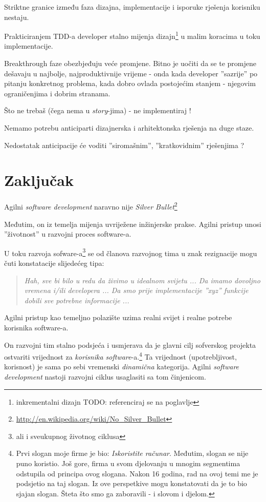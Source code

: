 \documentclass[lmodern, utf8, zavrsni]{fit}
\begin{document}
Striktne granice između faza dizajna, implementacije i isporuke rješenja korisniku nestaju.

Prakticiranjem TDD-a developer stalno mijenja dizajn\footnote{inkrementalni dizajn TODO: referenciraj se na poglavlje} u malim koracima u toku implementacije.

Breakthrough faze obezbjeđuju veće promjene. Bitno je uočiti da se te promjene dešavaju u najbolje, najproduktivnije vrijeme - onda kada developer ''sazrije'' po pitanju konkretnog problema, kada dobro ovlada postojećim stanjem - njegovim ograničenjima i dobrim stranama.

Što ne trebaš (čega nema u \emph{story}-jima) - ne implementiraj !

Nemamo potrebu anticiparti dizajnerska i arhitektonska rješenja na duge staze.

Nedostatak anticipacije će voditi ''siromašnim'', ''kratkovidnim'' rješenjima ?

{\color{red}{::ODGOVORITI, ELABORIRRATI::}}



\chapter{Zaključak}

Agilni \emph{software development} naravno nije \emph{Silver Bullet}\footnote{\url{http://en.wikipedia.org/wiki/No_Silver_Bullet}}

Međutim, on iz temelja mijenja uvriježene inžinjerske prakse. Agilni pristup unosi ''životnost'' u razvojni proces software-a.

U toku razvoja sofware-a\footnote{ali i sveukupnog životnog ciklusa} se od članova razvojnog tima u znak rezignacije mogu čuti konstatacije slijedećeg tipa:
\begin{quotation}
  \emph{Hah, sve bi bilo u redu da živimo u idealnom svijetu ... Da imamo dovoljno vremena i/ili developera ... Da smo prije implementacije ''xyz'' funkcije dobili sve potrebne informacije ...}
\end{quotation}

Agilni pristup kao temeljno polazište uzima realni svijet i realne potrebe korisnika software-a.

On razvojni tim stalno podsjeća i usmjerava da je glavni cilj sofverskog projekta ostvariti vrijednost za \emph{korisnika software}-a.\footnote{Prvi slogan moje firme je bio: \emph{Iskoristite računar}. Međutim, slogan se nije puno koristio. Još gore, firma u svom djelovanju u mnogim segmentima odstupila od principa ovog slogana. Nakon 16 godina, rad na ovoj temi me je podsjetio na taj slogan. Iz ove perspetkive mogu konstatovati da je to bio sjajan slogan. Šteta što smo ga zaboravili - i slovom i djelom.}
Ta vrijednost (upotrebljivost, korisnost) je sama po sebi vremenski \emph{dinamična} kategorija. Agilni \emph{software development} nastoji razvojni ciklus usaglasiti sa tom činjenicom.
\end{document}
